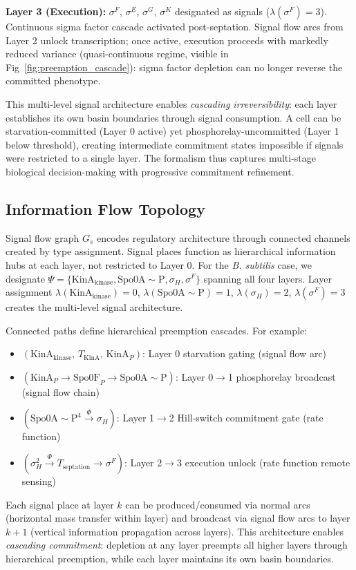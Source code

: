 \documentclass[10pt,letterpaper]{article}
\begin{document}
\vspace{3pt}
\noindent\textbf{Layer 3 (Execution):} $\sigma^F$, $\sigma^E$, $\sigma^G$, $\sigma^K$ designated as signals ($\lambda(\sigma^F) = 3$). Continuous sigma factor cascade activated post-septation. Signal flow arcs from Layer 2 unlock transcription; once active, execution proceeds with markedly reduced variance (quasi-continuous regime, visible in Fig~\ref{fig:preemption_cascade}): sigma factor depletion can no longer reverse the committed phenotype.

\vspace{3pt}
\noindent This multi-level signal architecture enables \textit{cascading irreversibility}: each layer establishes its own basin boundaries through signal consumption. A cell can be starvation-committed (Layer 0 active) yet phosphorelay-uncommitted (Layer 1 below threshold), creating intermediate commitment states impossible if signals were restricted to a single layer. The formalism thus captures multi-stage biological decision-making with progressive commitment refinement.

\subsection{Information Flow Topology}

Signal flow graph $G_s$ encodes regulatory architecture through connected channels created by type assignment. Signal places function as hierarchical information hubs at each layer, not restricted to Layer 0. For the \textit{B. subtilis} case, we designate $\Psi = \{\text{KinA}_{\text{kinase}}, \text{Spo0A}{\sim}\text{P}, \sigma_H, \sigma^F\}$ spanning all four layers. Layer assignment $\lambda(\text{KinA}_{\text{kinase}}) = 0$, $\lambda(\text{Spo0A}{\sim}\text{P}) = 1$, $\lambda(\sigma_H) = 2$, $\lambda(\sigma^F) = 3$ creates the multi-level signal architecture.

\vspace{3pt}
\noindent Connected paths define hierarchical preemption cascades. For example:
\begin{itemize}
\item $(\text{KinA}_{\text{kinase}},\, T_{\text{KinA}},\, \text{KinA}_P)$: Layer 0 starvation gating (signal flow arc)
\item $(\text{KinA}_P \to \text{Spo0F}_P \to \text{Spo0A}{\sim}\text{P})$: Layer 0$\rightarrow$1 phosphorelay broadcast (signal flow chain)
\item $(\text{Spo0A}{\sim}\text{P}^4 \xrightarrow{\Phi} \sigma_H)$: Layer 1$\rightarrow$2 Hill-switch commitment gate (rate function)
\item $(\sigma_H^2 \xrightarrow{\Phi} T_{\text{septation}} \to \sigma^F)$: Layer 2$\rightarrow$3 execution unlock (rate function remote sensing)
\end{itemize}
Each signal place at layer $k$ can be produced/consumed via normal arcs (horizontal mass transfer within layer) and broadcast via signal flow arcs to layer $k+1$ (vertical information propagation across layers). This architecture enables \textit{cascading commitment}: depletion at any layer preempts all higher layers through hierarchical preemption, while each layer maintains its own basin boundaries.
\end{document}
